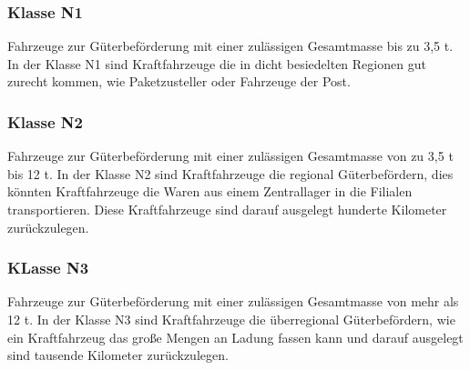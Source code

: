 \subsubsection{Klasse N1}
Fahrzeuge zur Güterbeförderung mit einer zulässigen Gesamtmasse bis zu 3,5 \ac{t}.
In der Klasse N1 sind Kraftfahrzeuge die in dicht besiedelten Regionen gut zurecht kommen, wie Paketzusteller oder Fahrzeuge der Post.


\subsubsection{Klasse N2}
Fahrzeuge zur Güterbeförderung mit einer zulässigen Gesamtmasse von zu 3,5 \ac{t} bis 12 \ac*{t}.
In der Klasse N2 sind Kraftfahrzeuge die regional Güterbefördern, dies könnten Kraftfahrzeuge die Waren aus einem Zentrallager in die Filialen transportieren.
Diese Kraftfahrzeuge sind darauf ausgelegt hunderte Kilometer zurückzulegen.


\subsubsection{KLasse N3}
Fahrzeuge zur Güterbeförderung mit einer zulässigen Gesamtmasse von mehr als 12 \ac{t}.
In der Klasse N3 sind Kraftfahrzeuge die überregional Güterbefördern, wie ein Kraftfahrzeug das große Mengen an Ladung fassen kann und darauf ausgelegt sind tausende Kilometer zurückzulegen.
